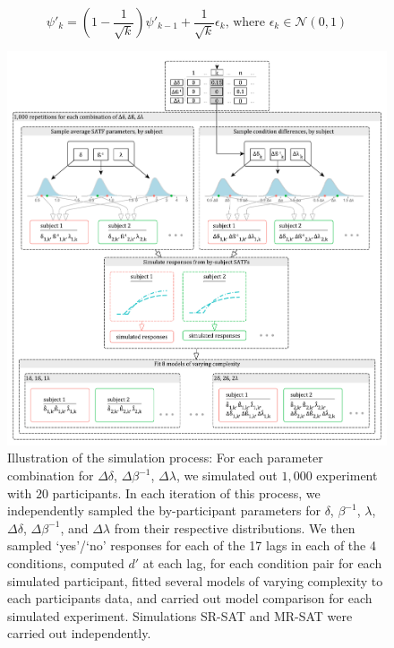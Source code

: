 \documentclass[10pt,letterpaper]{article}
\begin{document}
\begin{equation}
  \psi'_k = \left(1-\frac{1}{\sqrt{k}} \right) \psi'_{k-1} + \frac{1}{\sqrt{k}}\epsilon_k\text{, where }\epsilon_k \in \mathcal{N}(0,1)
\label{eq:mr_sat}
\end{equation}

\begin{figure}
\centering
\includegraphics{../figures/illustrations/satf_simulation.pdf} %
\caption{\label{fig:satf_simulation}Illustration of the simulation process: For each parameter combination for $\Delta\delta$, $\Delta\beta^{-1}$, $\Delta\lambda$, we simulated out $1,000$ experiment with $20$ participants. In each iteration of this process, we independently sampled the by-participant parameters for $\delta$, $\beta^{-1}$, $\lambda$, $\Delta\delta$, $\Delta\beta^{-1}$, and $\Delta\lambda$ from their respective distributions. We then sampled `yes'/`no' responses for each of the 17 lags in each of the 4 conditions, computed $d'$ at each lag, for each condition pair for each simulated participant, fitted several models of varying complexity to each participants data, and carried out model comparison for each simulated experiment. Simulations SR-SAT and MR-SAT were carried out independently.  }
\end{figure}
\end{document}
